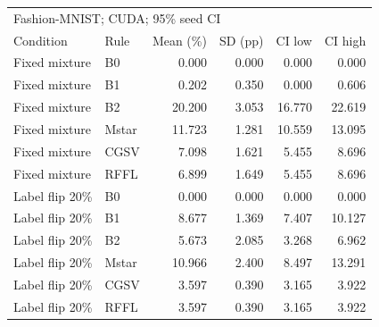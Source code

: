\begin{tabular}{llrrrr}
\toprule
\multicolumn{6}{l}{Fashion-MNIST; CUDA; 95\% seed CI} \\
Condition & Rule & Mean (\%) & SD (pp) & CI low & CI high \\
\midrule
Fixed mixture & B0 & 0.000 & 0.000 & 0.000 & 0.000 \\
Fixed mixture & B1 & 0.202 & 0.350 & 0.000 & 0.606 \\
Fixed mixture & B2 & 20.200 & 3.053 & 16.770 & 22.619 \\
Fixed mixture & Mstar & 11.723 & 1.281 & 10.559 & 13.095 \\
Fixed mixture & CGSV & 7.098 & 1.621 & 5.455 & 8.696 \\
Fixed mixture & RFFL & 6.899 & 1.649 & 5.455 & 8.696 \\
Label flip 20\% & B0 & 0.000 & 0.000 & 0.000 & 0.000 \\
Label flip 20\% & B1 & 8.677 & 1.369 & 7.407 & 10.127 \\
Label flip 20\% & B2 & 5.673 & 2.085 & 3.268 & 6.962 \\
Label flip 20\% & Mstar & 10.966 & 2.400 & 8.497 & 13.291 \\
Label flip 20\% & CGSV & 3.597 & 0.390 & 3.165 & 3.922 \\
Label flip 20\% & RFFL & 3.597 & 0.390 & 3.165 & 3.922 \\
\bottomrule
\end{tabular}
